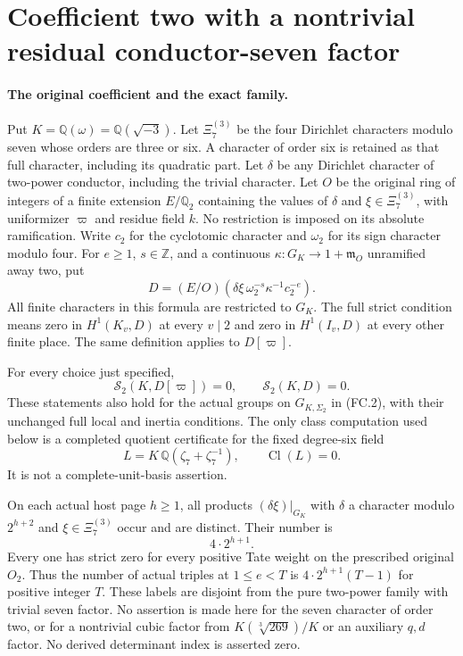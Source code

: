 \section{Coefficient two with a nontrivial residual conductor-seven factor}
\label{sec:coefficient-two-seven-strict}

\paragraph{The original coefficient and the exact family.}
Put $K=\mathbb Q(\omega)=\mathbb Q(\sqrt{-3})$.
Let $\Xi_7^{(3)}$ be the four Dirichlet characters modulo seven
whose orders are three or six.  A character of order six is retained
as that full character, including its quadratic part.
Let $\delta$ be any Dirichlet character of two-power conductor,
including the trivial character.  Let $O$ be the original ring of
integers of a finite extension $E/\mathbb Q_2$ containing the values
of $\delta$ and $\xi\in\Xi_7^{(3)}$, with uniformizer $\varpi$ and
residue field $k$.  No restriction is imposed on its absolute ramification.
Write $c_2$ for the cyclotomic character and $\omega_2$ for its
sign character modulo four.  For $e\geq1$, $s\in\mathbb Z$, and a
continuous $\kappa:G_K\to1+\mathfrak m_O$ unramified away two, put
\[
 D=(E/O)(\delta\xi\,\omega_2^{-s}\kappa^{-1}c_2^{-e}).
 \tag{G184.1}
\]
All finite characters in this formula are restricted to $G_K$.
The full strict condition means zero in $H^1(K_v,D)$ at every
$v\mid2$ and zero in $H^1(I_v,D)$ at every other finite place.
The same definition applies to $D[\varpi]$.

\begin{theorem}
\label{AC-G184}
For every choice just specified,
\[
           \mathcal S_2(K,D[\varpi])=0,
           \qquad \mathcal S_2(K,D)=0.                       \tag{G184.2}
\]
These statements also hold for the actual groups on
$G_{K,\Sigma_2}$ in (FC.2), with their unchanged full local and
inertia conditions.  The only class computation used below is a
completed quotient certificate for the fixed degree-six field
\[
 L=K\,\mathbb Q(\zeta_7+\zeta_7^{-1}),\qquad
                     \operatorname{Cl}(L)=0.                 \tag{G184.3}
\]
It is not a complete-unit-basis assertion.

On each actual host page $h\geq1$, all products
$(\delta\xi)|_{G_K}$ with $\delta$ a character modulo $2^{h+2}$
and $\xi\in\Xi_7^{(3)}$ occur and are distinct.  Their number is
\[
                         4\cdot2^{h+1}.                      \tag{G184.4}
\]
Every one has strict zero for every positive Tate weight on the
prescribed original $O_2$.  Thus the number of actual triples at
$1\leq e<T$ is $4\cdot2^{h+1}(T-1)$ for positive integer $T$.
These labels are disjoint from the pure two-power family with
trivial seven factor.  No assertion is made here for the seven
character of order two, or for a nontrivial cubic factor from $K(\sqrt[3]{269})/K$
or an auxiliary $q,d$ factor.  No derived determinant index is asserted zero.
\end{theorem}

